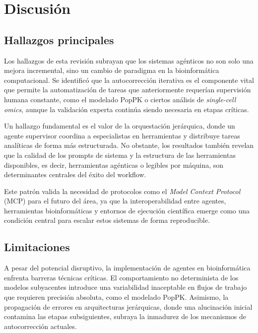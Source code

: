 
\section{Discusión}\label{sec:discussion}

\subsection{Hallazgos principales}\label{subsec:main-findings}

Los hallazgos de esta revisión subrayan que los sistemas agénticos no son solo
una mejora incremental, sino un cambio de paradigma en la bioinformática
computacional. Se identificó que la autocorrección iterativa es el componente
vital que permite la automatización de tareas que anteriormente requerían
supervisión humana constante, como el modelado PopPK o ciertos análisis de
\textit{single-cell omics}, aunque la validación experta continúa siendo
necesaria en etapas críticas.

Un hallazgo fundamental es el valor de la orquestación jerárquica, donde un
agente supervisor coordina a especialistas en herramientas y distribuye tareas
analíticas de forma más estructurada. No obstante, los resultados también
revelan que la calidad de los prompts de sistema y la estructura de las
herramientas disponibles, es decir, herramientas agénticas o legibles por
máquina, son determinantes centrales del éxito del workflow.

Este patrón valida la necesidad de protocolos como el \textit{Model Context
Protocol} (MCP) para el futuro del área, ya que la interoperabilidad entre
agentes, herramientas bioinformáticas y entornos de ejecución científica emerge
como una condición central para escalar estos sistemas de forma reproducible.

\subsection{Limitaciones}\label{subsec:discussion-limitations}

A pesar del potencial disruptivo, la implementación de agentes en
bioinformática enfrenta barreras técnicas críticas. El comportamiento no
determinista de los modelos subyacentes introduce una variabilidad inaceptable
en flujos de trabajo que requieren precisión absoluta, como el modelado PopPK.
Asimismo, la propagación de errores en arquitecturas jerárquicas, donde una
alucinación inicial contamina las etapas subsiguientes, subraya la inmadurez de
los mecanismos de autocorrección actuales.

